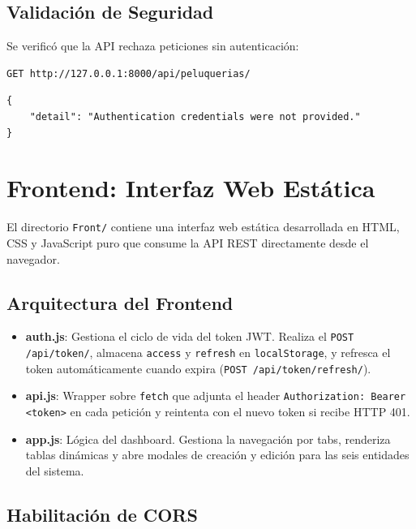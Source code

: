\documentclass[12pt,a4paper]{article}
\begin{document}
\subsection{Validación de Seguridad}

Se verificó que la API rechaza peticiones sin autenticación:

\begin{lstlisting}[caption=Acceso sin token — Solicitud]
GET http://127.0.0.1:8000/api/peluquerias/
\end{lstlisting}

\begin{lstlisting}[caption=Acceso sin token — Respuesta (HTTP 401)]
{
    "detail": "Authentication credentials were not provided."
}
\end{lstlisting}

\section{Frontend: Interfaz Web Estática}

El directorio \texttt{Front/} contiene una interfaz web estática desarrollada en
HTML, CSS y JavaScript puro que consume la API REST directamente desde el navegador.

\subsection{Arquitectura del Frontend}

\begin{itemize}
    \item \textbf{auth.js}: Gestiona el ciclo de vida del token JWT.  Realiza el \texttt{POST /api/token/},
          almacena \texttt{access} y \texttt{refresh} en \texttt{localStorage}, y refresca el token
          automáticamente cuando expira (\texttt{POST /api/token/refresh/}).
    \item \textbf{api.js}: Wrapper sobre \texttt{fetch} que adjunta el header
          \texttt{Authorization: Bearer <token>} en cada petición y reintenta con el nuevo token
          si recibe HTTP 401.
    \item \textbf{app.js}: Lógica del dashboard.  Gestiona la navegación por tabs,
          renderiza tablas dinámicas y abre modales de creación y edición para las seis
          entidades del sistema.
\end{itemize}

\subsection{Habilitación de CORS}
\end{document}

